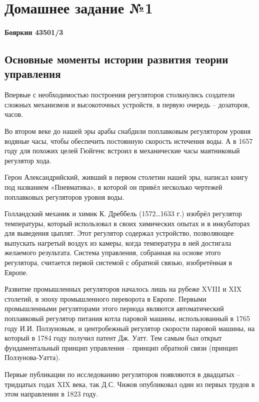 \documentclass[14pt,a4paper,report]{report}
\begin{document}
\chapter{Домашнее задание №1}

\subsubsection{Бояркин 43501/3}

\section{Основные моменты истории развития теории управления}

Впервые с необходимостью построения регуляторов столкнулись создатели сложных механизмов и высокоточных устройств, в первую очередь – дозаторов, часов.

Во втором веке до нашей эры арабы снабдили поплавковым регулятором уровня водяные часы, чтобы обеспечить постоянную скорость истечения воды. А в 1657 году для похожих целей Гюйгенс встроил в механические часы маятниковый регулятор хода.

Герон Александрийский, живший в первом столетии нашей эры, написал книгу под названием «Пневматика», в которой он привёл несколько чертежей поплавковых регуляторов уровня воды.

Голландский механик и химик К. Дреббель (1572…1633 г.) изобрёл регулятор температуры, который использовал в своих химических опытах и в инкубаторах для выведения цыплят. Этот регулятор содержал устройство, позволяющее выпускать нагретый воздух из камеры, когда температура в ней достигала желаемого результата. Система управления, собранная на основе этого регулятора, считается первой системой с обратной связью, изобретённая в Европе.

Развитие промышленных регуляторов началось лишь на рубеже XVIII и XIX столетий, в эпоху промышленного переворота в Европе. Первыми промышленными регуляторами этого периода являются автоматический поплавковый регулятор питания котла паровой машины, использованный в 1765 году И.И. Ползуновым, и центробежный регулятор скорости паровой машины, на который в 1784 году получил патент Дж. Уатт. Тем самым был открыт фундаментальный принцип управления – принцип обратной связи (принцип Ползунова-Уатта).

Первые публикации по исследованию регуляторов появляются в двадцатых – тридцатых годах XIX века, так Д.С. Чижов опубликовал один из первых трудов в этом направлении в 1823 году.
\end{document}

